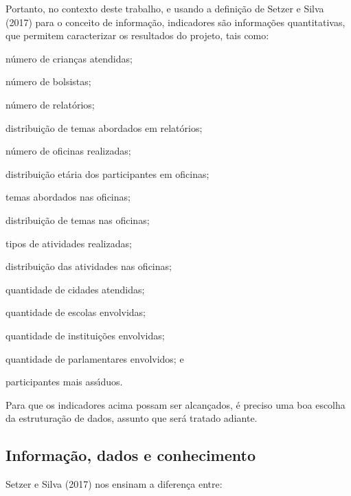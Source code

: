 \documentclass[
12pt,		%
openright,	%
twoside,  %
a4paper,			%
chapter=TITLE,		%
english,			%
french,				%
spanish,			%
brazil				%
]{USPSC-classe/USPSC}
\begin{document}
Portanto, no contexto deste trabalho, e usando a defini\c{c}\~ao de  Setzer e Silva (2017) para o conceito de \textquotedbl informa\c{c}\~ao\textquotedbl , indicadores s\~ao informa\c{c}\~oes quantitativas, que permitem caracterizar os resultados do projeto, tais como:


















\begin{alineas}
\item n\'umero de crian\c{c}as atendidas;
\item n\'umero de bolsistas;
\item n\'umero de relat\'orios;
\item distribui\c{c}\~ao de temas abordados em relat\'orios;
\item n\'umero de oficinas realizadas;
\item distribui\c{c}\~ao et\'aria dos participantes em oficinas;
\item temas abordados nas oficinas;
\item distribui\c{c}\~ao de temas nas oficinas;
\item tipos de atividades realizadas;
\item distribui\c{c}\~ao das atividades nas oficinas;
\item quantidade de cidades atendidas;
\item quantidade de escolas envolvidas;
\item quantidade de institui\c{c}\~oes envolvidas;
\item quantidade de parlamentares envolvidos; e
\item participantes mais ass\'{\i}duos.
\end{alineas}

Para que os indicadores acima possam ser alcan\c{c}ados, \'e preciso uma boa escolha da estrutura\c{c}\~ao de dados, assunto que ser\'a tratado adiante.

















\subsection[Informa\c{c}\~ao, dados e conhecimento]{Informa\c{c}\~ao, dados e conhecimento}\label{Informa\c{c}\~ao, dados e conhecimento}
 Setzer e Silva (2017)  nos ensinam a diferen\c{c}a entre:
\end{document}
